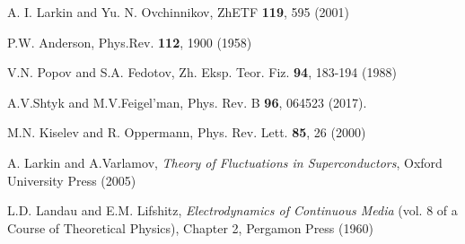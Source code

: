 \documentclass[twocolumn,english,prb]{revtex4-1}
\begin{document}
\begin{thebibliography}{99}
  A. I. Larkin and Yu. N. Ovchinnikov, ZhETF \textbf{119}, 595 (2001)

P.W. Anderson, Phys.Rev. \textbf{112}, 1900 (1958)

V.N. Popov and S.A. Fedotov, Zh. Eksp. Teor. Fiz. \textbf{94}, 183-194 (1988)

  A.V.Shtyk and M.V.Feigel'man, Phys. Rev. B \textbf{96}, 064523  (2017).

M.N. Kiselev and R. Oppermann, Phys. Rev. Lett. \textbf{85}, 26 (2000)

A. Larkin and A.Varlamov, \textit{Theory of Fluctuations in Superconductors}, Oxford University Press (2005)

L.D. Landau and E.M. Lifshitz, \textit{Electrodynamics of Continuous Media} (vol. 8 of a Course of Theoretical Physics), Chapter 2, Pergamon Press (1960)

\end{thebibliography}
\end{document}
